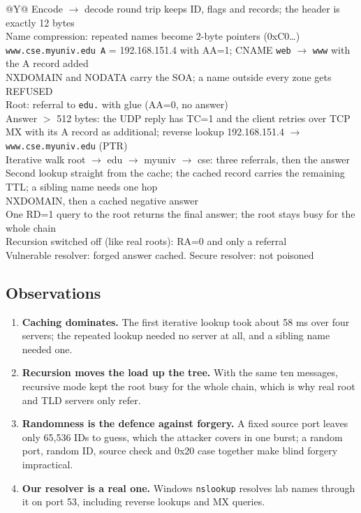 \documentclass[11pt,a4paper]{article}
\begin{document}
\begin{table}[H]
\centering
\caption{Selected verification checks (all passed)}
\small
\begin{tabularx}{\textwidth}{@{}Y@{}}
\toprule
Encode $\rightarrow$ decode round trip keeps ID, flags and records; the header is exactly 12 bytes \\
Name compression: repeated names become 2-byte pointers (0xC0\ldots) \\
\texttt{www.cse.myuniv.edu A} = 192.168.151.4 with AA=1; CNAME \texttt{web} $\rightarrow$ \texttt{www} with the A record added \\
NXDOMAIN and NODATA carry the SOA; a name outside every zone gets REFUSED \\
Root: referral to \texttt{edu.} with glue (AA=0, no answer) \\
Answer $>$ 512 bytes: the UDP reply has TC=1 and the client retries over TCP \\
MX with its A record as additional; reverse lookup 192.168.151.4 $\rightarrow$ \texttt{www.cse.myuniv.edu} (PTR) \\
Iterative walk root $\rightarrow$ edu $\rightarrow$ myuniv $\rightarrow$ cse: three referrals, then the answer \\
Second lookup straight from the cache; the cached record carries the remaining TTL; a sibling name needs one hop \\
NXDOMAIN, then a cached negative answer \\
One RD=1 query to the root returns the final answer; the root stays busy for the whole chain \\
Recursion switched off (like real roots): RA=0 and only a referral \\
Vulnerable resolver: forged answer cached. Secure resolver: not poisoned \\ \bottomrule
\end{tabularx}
\end{table}

\subsection{Observations}
\begin{enumerate}[leftmargin=2em]
    \item \textbf{Caching dominates.} The first iterative lookup took about 58 ms over four servers; the repeated lookup needed no server at all, and a sibling name needed one.
    \item \textbf{Recursion moves the load up the tree.} With the same ten messages, recursive mode kept the root busy for the whole chain, which is why real root and TLD servers only refer.
    \item \textbf{Randomness is the defence against forgery.} A fixed source port leaves only 65,536 IDs to guess, which the attacker covers in one burst; a random port, random ID, source check and 0x20 case together make blind forgery impractical.
    \item \textbf{Our resolver is a real one.} Windows \texttt{nslookup} resolves lab names through it on port 53, including reverse lookups and MX queries.
\end{enumerate}
\end{document}
